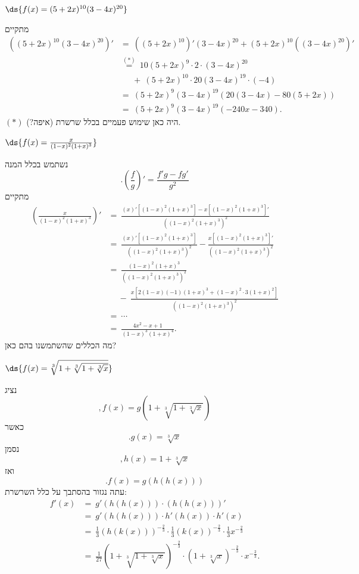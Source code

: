 \item $\ds{f(x) = (5 + 2x)^{10}(3 - 4x)^{20}}$
\begin{solbox}
מתקיים
\begin{align*}
    ((5 + 2x)^{10}(3 - 4x)^{20})'&=\ ((5 + 2x)^{10})'(3 - 4x)^{20}+(5 + 2x)^{10}((3 - 4x)^{20})'\\
    &\overset{(\ast)}{=}\ 10(5+2x)^9\cdot2\cdot(3-4x)^{20}\\
    &\quad\ \ +\ (5+2x)^{10}\cdot20(3-4x)^{19}\cdot(-4)\\
    &=\ (5+2x)^9(3-4x)^{19}(20(3-4x)-80(5+2x))\\
    &=\ (5+2x)^9(3-4x)^{19}(-240x-340).
\end{align*}
$(\ast)$
היה כאן שימוש פעמיים בכלל שרשרת
(איפה?).
\end{solbox}
\item $\ds{f(x) = \frac{x}{(1 - x)^2(1 + x)^3}}$
\begin{solbox}
נשתמש בכלל המנה
$$.\left(\frac{f}{g}\right)'=\frac{f'g-fg'}{g^2}$$
מתקיים
\begin{align*}
    \left(\frac{x}{(1 - x)^2(1 + x)^3}\right)'&=\ \frac{(x)'[(1 - x)^2(1 + x)^3]-x[(1 - x)^2(1 + x)^3]'}{\left((1 - x)^2(1 + x)^3\right)^2}\\
    &=\ \frac{(x)'[(1 - x)^2(1 + x)^3]}{\left((1 - x)^2(1 + x)^3\right)^2}-\frac{x[(1 - x)^2(1 + x)^3]'}{\left((1 - x)^2(1 + x)^3\right)^2}\\
    &=\ \frac{(1 - x)^2(1 + x)^3}{\left((1 - x)^2(1 + x)^3\right)^2}\\
    &\quad\ -\ \frac{x[2(1 - x)(-1)(1 + x)^3+(1-x)^2\cdot3(1+x)^2]}{\left((1 - x)^2(1 + x)^3\right)^2}\\
    &=\ \cdots\\
    &=\ \frac{4x^2-x+1}{(1-x)^3(1+x)^4}.
\end{align*}
מה הכללים שהשתמשנו בהם כאן?
\end{solbox}
\item $\ds{f(x) = \sqrt[3]{1 + \sqrt[3]{1 + \sqrt[3]{x}}}}$
\begin{solbox}
נציג
$$,f(x)=g\left(1+\sqrt[3]{1+\sqrt[3]{x}}\right)$$
כאשר
$$.g(x)=\sqrt[3]{x}$$
נסמן
$$,h(x)=1+\sqrt[3]{x}$$
ואז
$$.f(x)=g(h(h(x)))$$
עתה נגזור בהסתבך על כלל השרשרת:
\begin{align*}
    f'(x)&=\ g'(h(h(x)))\cdot (h(h(x)))'\\
    &=\ g'(h(h(x)))\cdot h'(h(x))\cdot h'(x)\\
    &=\ \frac{1}{3}(h(k(x)))^{-\frac{2}{3}}\cdot\frac{1}{3}(k(x))^{-\frac{2}{3}}\cdot\frac{1}{3}x^{-\frac{2}{3}}\\
    &=\ \frac{1}{27}\left(1+\sqrt[3]{1+\sqrt[3]{x}}\right)^{-\frac{2}{3}}\cdot\left(1+\sqrt[3]{x}\right)^{-\frac{2}{3}}\cdot x^{-\frac{2}{3}}.
\end{align*}
\end{solbox}
